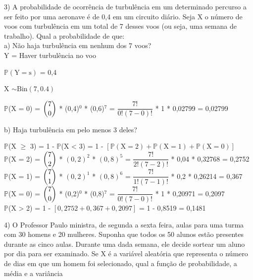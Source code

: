 \documentclass[12pt,a4paper,draft]{article}
\begin{document}
	3) A probabilidade de ocorrência de turbulência em um determinado percurso a ser feito por uma aeronave é de 0,4 em um circuito diário. Seja X o número de voos	com turbulência em um total de 7 desses voos (ou seja, uma semana de trabalho). Qual a probabilidade de que:\\
	a) Não haja turbulência em nenhum dos 7 voos?
	\vspace{0.5cm}\\
	Y = Haver turbulência no voo
	\begin{center}
		\vspace{1cm}
		$\mathbb{P}\left(\text{Y} = \text{s}\right)$ = 0,4
		\vspace{1cm}\\
	\end{center}
	X $\sim \text{Bin}(7, 0.4)$
	\vspace{1cm}\\
	\begin{center}
		$\mathbb{P}$(X = 0) = $\dbinom{7}{0}$ * (0,4)$^{0}$ * (0,6)$^7$ = $\dfrac{7!}{0!(7-0)!}$ * 1 * 0,02799 = 0,02799
	\end{center}
	\vspace{1cm}
	b) Haja turbulência em pelo menos 3 deles?
	\vspace{0.5cm}\\
	\begin{center}
		$\mathbb{P}$(X $\geq$ 3) = 1 - $\mathbb{P}$(X < 3) = 1 - $\left[\mathbb{P}(\text{X} = 2) + \mathbb{P}(\text{X} = 1) + \mathbb{P}(\text{X} = 0)\right]$
		\vspace{0.5cm}\\
		$\mathbb{P}$(X = 2) = $\dbinom{7}{2}$ * $\left(0,2\right)^2$ * $\left(0,8\right)^5$ = $\dfrac{7!}{2!(7-2)!}$ * 0,04 * 0,32768 = 0,2752
		\vspace{0.5cm}\\
		$\mathbb{P}$(X = 1) = $\dbinom{7}{1}$ * $\left(0,2\right)^1$ * $\left(0,8\right)^6$ = $\dfrac{7!}{1!(7-1)!}$ * 0,2 * 0,26214 = 0,367
		\vspace{0.5cm}\\
		$\mathbb{P}$(X = 0) = $\dbinom{7}{0}$ * (0,2)$^0$ * (0,8)$^7$ = $\dfrac{7!}{0!(7-0)!}$ * 1 * 0,20971 = 0,2097
		\vspace{0.5cm}\\
		$\mathbb{P}$(X > 2) = 1 - $\left[0,2752 + 0,367 + 0,2097\right]$ = 1 - 0,8519 = 0,1481
	\end{center}
	\vspace{1cm}
	4) O Professor Paulo ministra, de segunda a sexta feira, aulas para uma turma com 30 homens e 20 mulheres. Suponha que todos os 50 alunos estão presentes durante as cinco aulas. Durante uma dada semana, ele decide sortear um aluno por dia para ser examinado. Se X é a variável aleatória que representa o número de dias em que um homem foi selecionado, qual a função de probabilidade, a média e a variância
\end{document}

